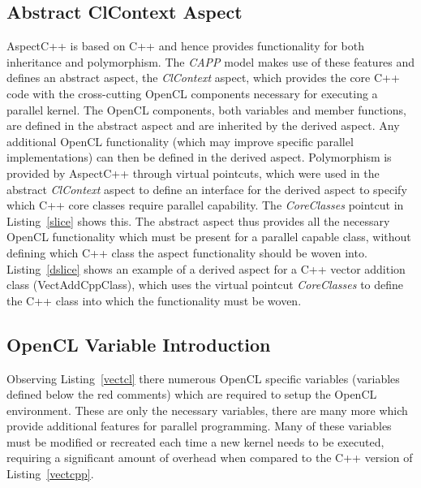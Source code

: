 \documentclass{sig-alternate-05-2015}
\begin{document}
\subsection{Abstract ClContext Aspect}

AspectC++ is based on C++ and hence provides functionality for both inheritance
and polymorphism. The \textit{CAPP} model makes use of these features and defines
an abstract aspect, the \textit{ClContext} aspect, which provides the core C++ code with 
the cross-cutting OpenCL components necessary for executing a parallel kernel.
The OpenCL  components, both variables and member functions, are defined in the abstract 
aspect and are inherited by the derived aspect. Any additional OpenCL
functionality (which may improve specific parallel implementations) can then be 
defined in the derived aspect. Polymorphism is provided by AspectC++ 
through virtual pointcuts, which were used in the abstract
\textit{ClContext} aspect to define an interface for the derived aspect
to specify which C++ core classes require parallel capability.
The \textit{CoreClasses} pointcut in Listing~\ref{slice} shows this.
The abstract aspect thus provides all the necessary OpenCL functionality which
must be present for a parallel capable class, without defining which C++ class 
the aspect functionality should be woven into. Listing~\ref{dslice} shows an
example of a derived aspect for a C++ vector addition class (VectAddCppClass), 
which uses the virtual pointcut \textit{CoreClasses} to define the C++ class
into which the functionality must be woven.

\subsection{OpenCL Variable Introduction}

Observing Listing~\ref{vectcl} there numerous OpenCL specific variables
(variables defined below the red comments) which are required to setup the 
OpenCL environment. These are only the necessary variables, there are many
more which provide additional features for parallel programming.
Many of these variables must be modified or recreated each
time a new kernel needs to be executed, requiring a significant amount of 
overhead when compared to the C++ version of Listing~\ref{vectcpp}.
\end{document}
